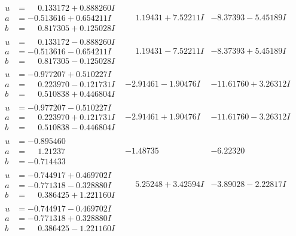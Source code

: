 \documentclass[1p]{elsarticle_modified}
\theoremstyle{definition}
\begin{document}
$$\begin{array}{c|c|c}
\begin{aligned}
u &= \phantom{-}0.133172 + 0.888260 I \\
a &= -0.513616 + 0.654211 I \\
b &= \phantom{-}0.817305 + 0.125028 I\end{aligned}
 & \phantom{-}1.19431 + 7.52211 I & -8.37393 - 5.45189 I \\ \hline\begin{aligned}
u &= \phantom{-}0.133172 - 0.888260 I \\
a &= -0.513616 - 0.654211 I \\
b &= \phantom{-}0.817305 - 0.125028 I\end{aligned}
 & \phantom{-}1.19431 - 7.52211 I & -8.37393 + 5.45189 I \\ \hline\begin{aligned}
u &= -0.977207 + 0.510227 I \\
a &= \phantom{-}0.223970 - 0.121731 I \\
b &= \phantom{-}0.510838 + 0.446804 I\end{aligned}
 & -2.91461 - 1.90476 I & -11.61760 + 3.26312 I \\ \hline\begin{aligned}
u &= -0.977207 - 0.510227 I \\
a &= \phantom{-}0.223970 + 0.121731 I \\
b &= \phantom{-}0.510838 - 0.446804 I\end{aligned}
 & -2.91461 + 1.90476 I & -11.61760 - 3.26312 I \\ \hline\begin{aligned}
u &= -0.895460\phantom{ +0.000000I} \\
a &= \phantom{-}1.21237\phantom{ +0.000000I} \\
b &= -0.714433\phantom{ +0.000000I}\end{aligned}
 & -1.48735\phantom{ +0.000000I} & -6.22320\phantom{ +0.000000I} \\ \hline\begin{aligned}
u &= -0.744917 + 0.469702 I \\
a &= -0.771318 - 0.328880 I \\
b &= \phantom{-}0.386425 + 1.221160 I\end{aligned}
 & \phantom{-}5.25248 + 3.42594 I & -3.89028 - 2.22817 I \\ \hline\begin{aligned}
u &= -0.744917 - 0.469702 I \\
a &= -0.771318 + 0.328880 I \\
b &= \phantom{-}0.386425 - 1.221160 I\end{aligned}

\end{array}$$
\end{document}
